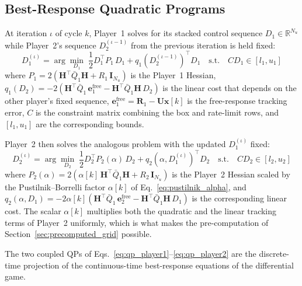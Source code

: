 \documentclass[12pt,a4paper,oneside]{report}
\begin{document}
\subsection{Best-Response Quadratic Programs}
\label{sec:best_response_qp}

At iteration $\iota$ of cycle $k$, Player~1 solves for its stacked control sequence $D_1 \in \mathbb{R}^{N_u}$ while Player~2's sequence $D_2^{(\iota-1)}$ from the previous iteration is held fixed:
\begin{equation}
D_1^{(\iota)} = \arg\min_{D_1} \; \frac{1}{2} D_1^{\top} P_1 \, D_1 + q_1(D_2^{(\iota-1)})^{\top} D_1
\quad \text{s.t.} \quad C D_1 \in [l_1, u_1]
\label{eq:qp_player1}
\end{equation}
where $P_1 = 2 \left( \mathbf{H}^{\top} \bar{Q}_1 \mathbf{H} + R_1 \, \mathbf{I}_{N_u} \right)$ is the Player~1 Hessian, $q_1(D_2) = -2 \left( \mathbf{H}^{\top} \bar{Q}_1 \, \mathbf{e}_1^{\text{free}} - \mathbf{H}^{\top} \bar{Q}_1 \mathbf{H} \, D_2 \right)$ is the linear cost that depends on the other player's fixed sequence, $\mathbf{e}_1^{\text{free}} = \mathbf{R}_1 - \mathbf{U} \mathbf{x}[k]$ is the free-response tracking error, $C$ is the constraint matrix combining the box and rate-limit rows, and $[l_1, u_1]$ are the corresponding bounds.

Player~2 then solves the analogous problem with the updated $D_1^{(\iota)}$ fixed:
\begin{equation}
D_2^{(\iota)} = \arg\min_{D_2} \; \frac{1}{2} D_2^{\top} P_2(\alpha) \, D_2 + q_2(\alpha, D_1^{(\iota)})^{\top} D_2
\quad \text{s.t.} \quad C D_2 \in [l_2, u_2]
\label{eq:qp_player2}
\end{equation}
where $P_2(\alpha) = 2 \left( \alpha[k] \, \mathbf{H}^{\top} \bar{Q}_1 \mathbf{H} + R_2 \, \mathbf{I}_{N_u} \right)$ is the Player~2 Hessian scaled by the Pustilnik--Borrelli factor $\alpha[k]$ of Eq.~\eqref{eq:pustilnik_alpha}, and $q_2(\alpha, D_1) = -2 \alpha[k] \left( \mathbf{H}^{\top} \bar{Q}_1 \, \mathbf{e}_2^{\text{free}} - \mathbf{H}^{\top} \bar{Q}_1 \mathbf{H} \, D_1 \right)$ is the corresponding linear cost. The scalar $\alpha[k]$ multiplies both the quadratic and the linear tracking terms of Player~2 uniformly, which is what makes the pre-computation of Section~\ref{sec:precomputed_grid} possible.

The two coupled QPs of Eqs.~\eqref{eq:qp_player1}--\eqref{eq:qp_player2} are the discrete-time projection of the continuous-time best-response equations of the differential game.
\end{document}
